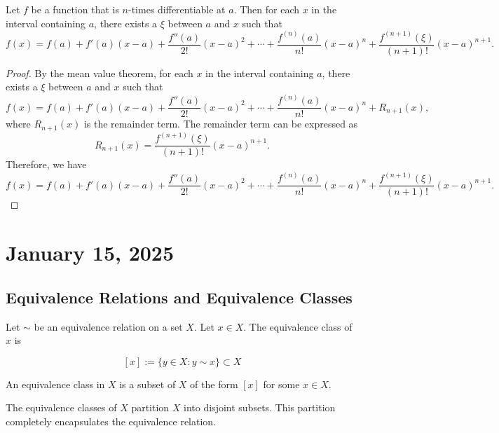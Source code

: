 \documentclass[11pt, draft]{article}
\begin{document}
\begin{theorem}
    Let \( f \) be a function that is \( n \)-times differentiable at \( a \). Then for each \( x \) in the interval containing \( a \), there exists a \( \xi \) between \( a \) and \( x \) such that
    \[
        f(x) = f(a) + f'(a)(x - a) + \frac{f''(a)}{2!}(x - a)^2 + \cdots + \frac{f^{(n)}(a)}{n!}(x - a)^n + \frac{f^{(n+1)}(\xi)}{(n+1)!}(x - a)^{n+1}.
    \]
\end{theorem}

\begin{proof}
    By the mean value theorem, for each \( x \) in the interval containing \( a \), there exists a \( \xi \) between \( a \) and \( x \) such that
    \[
        f(x) = f(a) + f'(a)(x - a) + \frac{f''(a)}{2!}(x - a)^2 + \cdots + \frac{f^{(n)}(a)}{n!}(x - a)^n + R_{n+1}(x),
    \]
    where \( R_{n+1}(x) \) is the remainder term. The remainder term can be
    expressed as
    \[
        R_{n+1}(x) = \frac{f^{(n+1)}(\xi)}{(n+1)!}(x - a)^{n+1}.
    \]
    Therefore, we have
    \[
        f(x) = f(a) + f'(a)(x - a) + \frac{f''(a)}{2!}(x - a)^2 + \cdots + \frac{f^{(n)}(a)}{n!}(x - a)^n + \frac{f^{(n+1)}(\xi)}{(n+1)!}(x - a)^{n+1}.
    \]
\end{proof}

\section{January 15, 2025}

\subsection{Equivalence Relations and Equivalence Classes}

\begin{definition} Let $\sim$ be an equivalence relation on a set $X$. Let $x \in X$. The equivalence class of $x$ is

    \[
        [x] := \{ y \in X : y \sim x \} \subset X
    \]

    An equivalence class in $X$ is a subset of $X$ of the form $[x]$ for some $x
        \in X$.
\end{definition}

\begin{fact} The equivalence classes of $X$ partition $X$ into disjoint subsets. This partition completely encapsulates the equivalence relation.
\end{fact}
\end{document}
